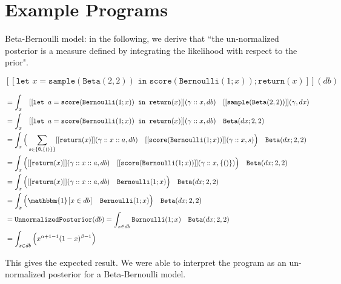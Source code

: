 \documentclass[11pt]{article}
\theoremstyle{definition}
\theoremstyle{plain}
\begin{document}
\section{Example Programs}


\noindent Beta-Bernoulli model: in the following, we derive that ``the un-normalized posterior is a measure defined by integrating the likelihood with respect to the prior".

    $$[[\texttt{let } x = \texttt{sample}(\texttt{Beta}(2,2)) \texttt{ in score} (\texttt{Bernoulli}(1;x));\texttt{return}(x)]](db)$$

\begin{align*}
    &= \int_x \quad [[\texttt{let } a =\texttt{score}(\texttt{Bernoulli}(1;x)) \texttt{ in return}(x)]](\gamma::x, db) 
        \quad [[\texttt{sample}(\texttt{Beta}(2,2))]](\gamma,dx)\\
    &= \int_x \quad [[\texttt{let } a =\texttt{score}(\texttt{Bernoulli}(1;x)) \texttt{ in return}(x)]](\gamma::x, db) 
        \quad \texttt{Beta}(dx;2,2)\\
    &= \int_x 
        \Big( \sum_{s \in \{\emptyset,\{()\} \}} [[\texttt{return}(x)]](\gamma::x::a,db) \quad [[\texttt{score}(\texttt{Bernoulli}(1;x))]](\gamma::x,s) \Big)
        \quad \texttt{Beta}(dx;2,2)\\
    &= \int_x 
        \Big( [[\texttt{return}(x)]](\gamma::x::a,db) \quad [[\texttt{score}(\texttt{Bernoulli}(1;x))]](\gamma::x,\{()\}) \Big)
        \quad \texttt{Beta}(dx;2,2)\\
    &= \int_x 
        \Big( [[\texttt{return}(x)]](\gamma::x::a,db) \quad \texttt{Bernoulli}(1;x) \Big)
        \quad \texttt{Beta}(dx;2,2)\\
    &= \int_x 
        \Big(\mathbbm{1}\big[ x \in db \big] \quad \texttt{Bernoulli}(1;x) \Big)
        \quad \texttt{Beta}(dx;2,2)\\
    &= \texttt{UnnormalizedPosterior}(db) = \int_{x \in db} 
        \texttt{Bernoulli}(1;x) \quad \texttt{Beta}(dx;2,2)\\
    &= \int_{x \in db} \Big(x^{\alpha + 1 - 1}(1-x)^{\beta - 1}\Big)
    \end{align*}

\noindent This gives the expected result. We were able to interpret the program as an un-normalized posterior for a Beta-Bernoulli model.\\
\end{document}
